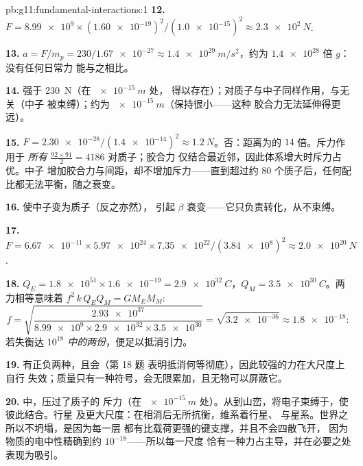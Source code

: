 \begin{solution}{pb:g11:fundamental-interactions:1}
\textbf{12.} $F = \num{8.99e9} \times (\num{1.60e-19})^2 /
(\num{1.0e-15})^2 \approx \qty{2.3e2}{N}$.

\textbf{13.} $a = F/m_p = 230/\num{1.67e-27} \approx
\qty{1.4e29}{m/s^2}$，约为 $\num{1.4e28}$ 倍 $g$：没有任何日常力
能与之相比。

\textbf{14.} 强于 \qty{230}{N}（在 $\qty{e-15}{m}$ 处，
得以存在）；对质子与中子同样作用，与无关（中子
被束缚）；约为 $\qty{e-15}{m}$（保持很小——这种
胶合力无法延伸得更远）。

\textbf{15.} $F = \num{2.30e-28}/(\num{1.4e-14})^2 \approx
\qty{1.2}{N}$。否：距离为的 $14$ 倍。斥力作用于
\emph{所有} $\frac{92\times91}{2} = 4186$ 对质子；胶合力
仅结合最近邻，因此体系增大时斥力占优。中子
增加胶合力与间距，却不增加斥力——直到超过约 $80$
个质子后，任何配比都无法平衡，随之衰变。

\textbf{16.} 使中子变为质子（反之亦然），
引起 $\beta$ 衰变——它只负责转化，从不束缚。

\textbf{17.} $F = \num{6.67e-11} \times \num{5.97e24} \times
\num{7.35e22}/(\num{3.84e8})^2 \approx \qty{2.0e20}{N}$.

\textbf{18.} $Q_E = \num{1.8e51} \times \num{1.6e-19} =
\qty{2.9e32}{C}$，$Q_M = \qty{3.5e30}{C}$。两力相等意味着
$f^2\,k\,Q_E Q_M = G M_E M_M$:
\[
f = \sqrt{\frac{\num{2.93e37}}{\num{8.99e9} \times \num{2.9e32}
\times \num{3.5e30}}} = \sqrt{\num{3.2e-36}} \approx \num{1.8e-18} :
\]
若失衡达 \emph{$10^{18}$ 中的两份}，便足以抵消引力。

\textbf{19.} 有正负两种，且会（第 18 题
表明抵消何等彻底），因此较强的力在大尺度上自行
失效；质量只有一种符号，会无限累加，且无物可以屏蔽它。

\textbf{20.} 中，压过了质子的
斥力（在 $\qty{e-15}{m}$ 处）。从到山峦，将电子束缚于，使彼此结合。行星
及更大尺度：在相消后无所抗衡，维系着行星、
与星系。世界之所以不坍塌，是因为每一层
都有比载荷更强的键支撑，并且不会四散飞开，
因为物质的电中性精确到约 $10^{-18}$——所以每一尺度
恰有一种力占主导，并在必要之处表现为吸引。
\end{solution}
